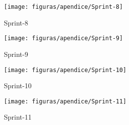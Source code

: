 \begin{apendicesenv}
\begin{figure}[!h]
	\centering
	\texttt{[image: figuras/apendice/Sprint-8]}
	\caption{Sprint-8}
	\label{fig:sprint_8}
\end{figure}

\begin{figure}[!h]
	\centering
	\texttt{[image: figuras/apendice/Sprint-9]}
	\caption{Sprint-9}
	\label{fig:sprint_9}
\end{figure}

\begin{figure}[!h]
	\centering
	\texttt{[image: figuras/apendice/Sprint-10]}
	\caption{Sprint-10}
	\label{fig:sprint_10}
\end{figure}

\begin{figure}[!h]
	\centering
	\texttt{[image: figuras/apendice/Sprint-11]}
	\caption{Sprint-11}
	\label{fig:sprint_11}
\end{figure}

\end{apendicesenv}
